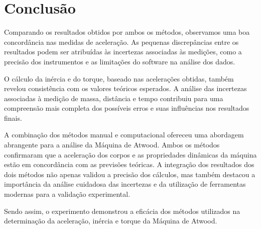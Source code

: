 \documentclass[a4papper, 10pt]{article}
\begin{document}
\section{Conclusão}
\vspace{0.10 cm}

Comparando os resultados obtidos por ambos os métodos, observamos uma boa concordância nas medidas de aceleração. As pequenas discrepâncias entre os resultados podem ser atribuídas às incertezas associadas às medições, como a precisão dos instrumentos e as limitações do software na análise dos dados.

O cálculo da inércia e do torque, baseado nas acelerações obtidas, também revelou consistência com os valores teóricos esperados. A análise das incertezas associadas à medição de massa, distância e tempo contribuiu para uma compreensão mais completa dos possíveis erros e suas influências nos resultados finais.


A combinação dos métodos manual e computacional ofereceu uma abordagem abrangente para a análise da Máquina de Atwood. Ambos os métodos confirmaram que a aceleração dos corpos e as propriedades dinâmicas da máquina estão em concordância com as previsões teóricas. A integração dos resultados dos dois métodos não apenas validou a precisão dos cálculos, mas também destacou a importância da análise cuidadosa das incertezas e da utilização de ferramentas modernas para a validação experimental.

Sendo assim, o experimento demonstrou a eficácia dos métodos utilizados na determinação da aceleração, inércia e torque da Máquina de Atwood.
\vspace{0.10 cm}
\newpage
\end{document}
